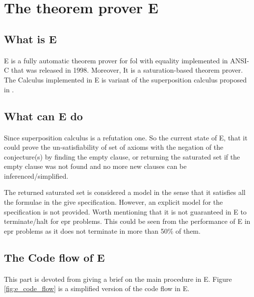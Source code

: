 \section{The theorem prover E} \label{sec:c2s4}
\subsection{What is E}
\paragraph{}
E is a fully automatic theorem prover for \ac{fol} with equality implemented in ANSI-C that was released in 1998. Moreover, It is a saturation-based theorem prover. The Calculus implemented in E is variant of the superposition calculus proposed in \cite{BAGA94}.


\subsection{What can E do}
\paragraph{}
Since superposition calculus is a refutation one. So the current state of E, that it could prove the un-satisfiability of set of axioms with the negation of the conjecture(s) by finding the empty clause, or returning the saturated set if the empty clause was not found and no more new clauses can be inferenced/simplified. 


The returned saturated set is considered a model in the sense that it satisfies all the formulae in the give specification. However, an explicit model for the specification is not provided. Worth mentioning that it is not guaranteed in E to terminate/halt for \ac{epr} problems. This could be seen from the performance of E in \ac{epr} problems as it does not terminate in more than 50\% of them. 



\subsection{The Code flow of E}
\paragraph{}
This part is devoted from giving a brief on the main procedure in E. Figure \ref{fig:e_code_flow} is a simplified version of the code flow in E.

